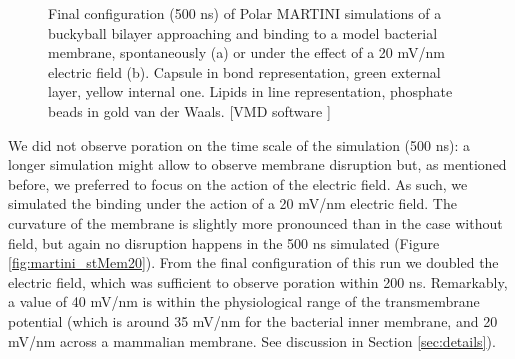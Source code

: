 \begin{figure}[t!]
\centering
{}
\caption[Bacterial membrane and buckyball bilayer (MARTINI simulations)]{Final configuration (500 ns) of Polar MARTINI simulations of a buckyball bilayer approaching and binding to a model bacterial membrane, spontaneously (a) or under the effect of a 20 mV/nm electric field (b). Capsule in bond representation, green external layer, yellow internal one. Lipids in line representation, phosphate beads in gold van der Waals. [VMD software \citet{HUMP96}]}
\label{fig:martini_stMem}
\end{figure}

We did not observe poration on the time scale of the simulation (500 ns): a longer simulation might allow to observe membrane disruption but, as mentioned before, we preferred to focus on the action of the electric field. As such, we simulated the binding under the action of a 20 mV/nm electric field. The curvature of the membrane is slightly more pronounced than in the case without field, but again no disruption happens in the 500 ns simulated (Figure \ref{fig:martini_stMem20}).
From the final configuration of this run we doubled the electric field, which was sufficient to observe poration within 200 ns.
%
Remarkably, a value of 40 mV/nm is within the physiological range of the transmembrane potential (which is around 35 mV/nm for the bacterial inner membrane, and 20 mV/nm across a mammalian membrane. See discussion in Section \ref{sec:details}).

